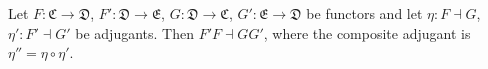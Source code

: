 Let $F : \mathfrak{C} \to \mathfrak{D}$, $F' : \mathfrak{D} \to \mathfrak{E}$, $G : \mathfrak{D} \to \mathfrak{C}$, $G' : \mathfrak{E} \to \mathfrak{D}$ be functors and let $\eta : F \dashv G$, $\eta' : F' \dashv G'$ be adjugants. Then $F'F \dashv GG'$, where the composite adjugant is $\eta'' = \eta \circ \eta'$.
